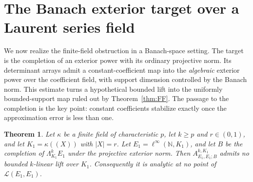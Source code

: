 \documentclass[11pt]{amsart}
\newtheorem{theorem}{Theorem}[section]
\theoremstyle{definition}
\theoremstyle{remark}
\numberwithin{equation}{section}
\newcommand{\N}{\mathbb N}
\newcommand{\cL}{\mathcal L}
\newcommand{\linf}{\ell^\infty}
\newcommand{\abs}[1]{\lvert #1\rvert}
\begin{document}
\section{The Banach exterior target over a Laurent series field}\label{app:laurent}\label{sec:laurent}

We now realize the finite-field obstruction in a Banach-space setting. The target is the completion of an exterior
power with its ordinary projective norm. Its determinant arrays admit a constant-coefficient map into the
\emph{algebraic} exterior power over the coefficient field, with support dimension controlled by the Banach norm.
This estimate turns a hypothetical bounded lift into the uniformly bounded-support map ruled out by
Theorem~\ref{thm:FF}. The passage to the completion is the key point: constant coefficients stabilize exactly once
the approximation error is less than one.

\begin{theorem}\label{thm:laurent}
Let $\kappa$ be a finite field of characteristic $p$, let $k\ge p$ and $r\in(0,1)$, and let $K_1=\kappa((X))$ with
$\abs X=r$. Let $E_1=\linf(\N,K_1)$, and let $B$ be the completion of $\Lambda^k_{K_1}E_1$ under the projective exterior
norm. Then $A^{k,K_1}_{E_1,E_1;B}$ admits no bounded $k$\nobreakdash-linear lift over $K_1$. Consequently it is analytic at no point of
$\cL(E_1,E_1)$.
\end{theorem}
\end{document}
